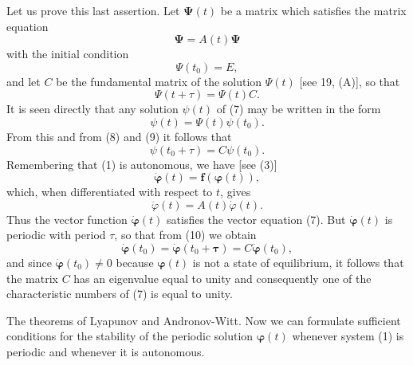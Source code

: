 \documentclass[10pt,a5paper]{book}
\theoremstyle{plain}
\theoremstyle{definition}
\theoremstyle{remark}
\begin{document}
Let us prove this last assertion. Let $\boldsymbol{\Psi}(t)$ be a matrix which satisfies the matrix equation
\[
\boldsymbol{\Psi}=A(t) \boldsymbol{\Psi}
\]
with the initial condition
\begin{equation*}
\Psi\left(t_{0}\right)=E, \tag{8}
\end{equation*}
and let $C$ be the fundamental matrix of the solution $\Psi(t)$ [see 19, (A)], so that
\begin{equation*}
\Psi(t+\tau)=\Psi(t) C . \tag{9}
\end{equation*}
It is seen directly that any solution $\psi(t)$ of (7) may be written in the form
\[
\psi(t)=\Psi(t) \psi\left(t_{0}\right) .
\]
From this and from (8) and (9) it follows that
\begin{equation*}
\psi\left(t_{0}+\tau\right)=C \psi\left(t_{0}\right) . \tag{10}
\end{equation*}
Remembering that (1) is autonomous, we have [see (3)]
\[
\dot{\boldsymbol{\varphi}}(t)=\mathbf{f}(\boldsymbol{\varphi}(t)),
\]
which, when differentiated with respect to $t$, gives
\[
\ddot{\varphi}(t)=A(t) \dot{\varphi}(t) .
\]
Thus the vector function $\dot{\boldsymbol{\varphi}}(t)$ satisfies the vector equation (7). But $\dot{\boldsymbol{\varphi}}(t)$ is periodic with period $\tau$, so that from (10) we obtain
\begin{equation*}
\dot{\boldsymbol{\varphi}}\left(t_{0}\right)=\dot{\boldsymbol{\varphi}}\left(t_{0}+\boldsymbol{\tau}\right)=C \dot{\boldsymbol{\varphi}}\left(t_{0}\right), \tag{11}
\end{equation*}
and since $\dot{\boldsymbol{\varphi}}\left(t_{0}\right) \neq 0$ because $\boldsymbol{\varphi}(t)$ is not a state of equilibrium, it follows that the matrix $C$ has an eigenvalue equal to unity and consequently one of the characteristic numbers of (7) is equal to unity.

The theorems of Lyapunov and Andronov-Witt. Now we can formulate sufficient conditions for the stability of the periodic solution $\boldsymbol{\varphi}(t)$ whenever system (1) is periodic and whenever it is autonomous.
\end{document}
